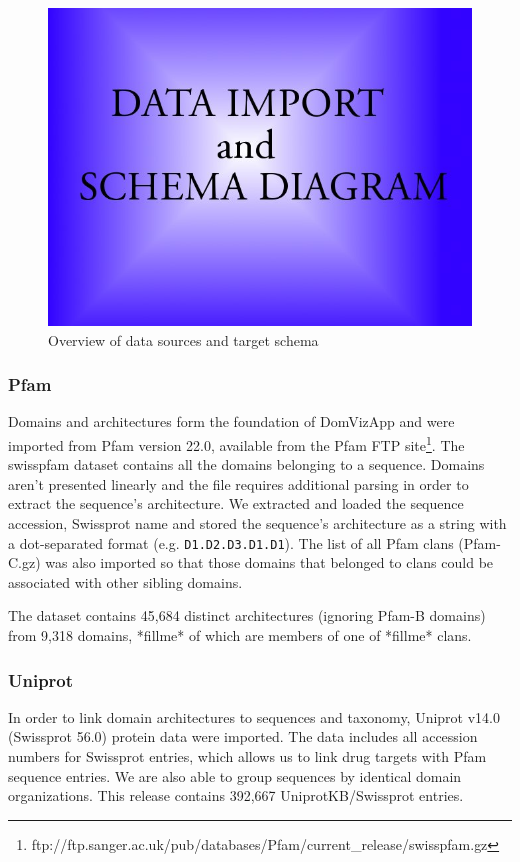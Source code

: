\begin{figure}[h]
 \begin{center}
 \includegraphics[scale=0.5]{figures/placeholder.jpg}
 \end{center}
 \caption{Overview of data sources and target schema}
 \label{dataimport}
\end{figure}

\subsubsection{Pfam}
Domains and architectures form the foundation of DomVizApp and were imported from Pfam version 22.0, available from the Pfam FTP site\footnote{ftp://ftp.sanger.ac.uk/pub/databases/Pfam/current\_release/swisspfam.gz}. The swisspfam dataset contains all the domains belonging to a sequence. Domains aren't presented linearly and the file requires additional parsing in order to extract the sequence's architecture. We extracted and loaded the sequence accession, Swissprot name and stored the sequence's architecture as a string with a dot-separated format (e.g. \texttt{D1.D2.D3.D1.D1}). The list of all Pfam clans (Pfam-C.gz) was also imported so that those domains that belonged to clans could be associated with other sibling domains. 

The dataset contains 45,684 distinct architectures (ignoring Pfam-B domains) from 9,318 domains, *fillme* of which are members of one of *fillme* clans.

\subsubsection{Uniprot}
In order to link domain architectures to sequences and taxonomy, Uniprot v14.0 (Swissprot 56.0) protein data were imported. The data includes all accession numbers for Swissprot entries, which allows us to link drug targets with Pfam sequence entries. We are also able to group sequences by identical domain organizations. This release contains 392,667 UniprotKB/Swissprot entries. %

